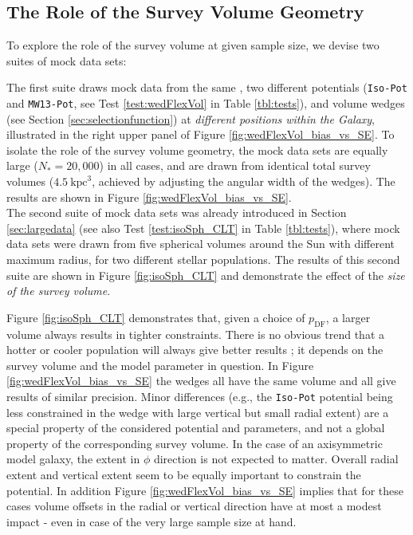 \subsection{The Role of the Survey Volume Geometry} \label{sec:results_obsvolume}


To explore the role of the survey volume at given sample size, we devise two suites of mock data sets: 

The first suite draws mock data from the same \pmodel{}, two different potentials (\texttt{Iso-Pot} and \texttt{MW13-Pot}, see Test \ref{test:wedFlexVol} in Table \ref{tbl:tests}), and volume wedges (see Section \ref{sec:selectionfunction}) at {\it different positions within the Galaxy}, illustrated in the right upper panel of Figure \ref{fig:wedFlexVol_bias_vs_SE}. To isolate the role of the survey volume geometry, the mock data sets are equally large ($N_{*} = 20,000$) in all cases, and are drawn from identical total survey volumes ($4.5~\text{kpc}^3$, achieved by adjusting the angular width of the wedges). The results are shown in Figure \ref{fig:wedFlexVol_bias_vs_SE}.
\\The second suite of mock data sets was already introduced in Section \ref{sec:largedata} (see also Test \ref{test:isoSph_CLT} in Table \ref{tbl:tests}), where mock data sets were drawn from five spherical volumes around the Sun with different maximum radius, for two different stellar populations. The results of this second suite are shown in Figure \ref{fig:isoSph_CLT} and demonstrate the effect of the {\it size of the survey volume}.

Figure \ref{fig:isoSph_CLT} demonstrates that, given a choice of $p_\text{DF}$, a larger volume always results in tighter constraints. There is no obvious trend that a hotter or cooler population will always give better results ; it depends on the survey volume and the model parameter in question. In Figure \ref{fig:wedFlexVol_bias_vs_SE} the wedges all have the same volume and all give results of similar precision. Minor differences (e.g., the \texttt{Iso-Pot} potential being less constrained in the wedge with large vertical but small radial extent) are a special property of the considered potential and parameters, and not a global property of the corresponding survey volume. In the case of an axisymmetric model galaxy, the extent in $\phi$ direction is not expected to matter. Overall radial extent and vertical extent seem to be equally important to constrain the potential. In addition Figure \ref{fig:wedFlexVol_bias_vs_SE} implies that for these cases volume offsets in the radial or vertical direction have at most a modest impact - even in case of the very large sample size at hand.

